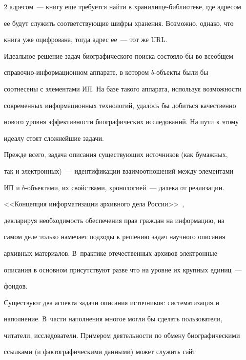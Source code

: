 \begin{multicols}{2}
адресом~--- книгу еще требуется \mbox{найти} в хранилище-библиотеке, где адресом 


ее будут служить соответствующие шиф\-ры хранения. Возможно, однако, что 


книга уже оциф\-ро\-ва\-на, тогда адрес ее~--- тот же URL.


  


  Идеальное решение задач биографического поиска состояло бы во всеобщем 


справочно-ин\-фор\-ма\-ци\-он\-ном аппарате, в котором $b$-объекты были бы 


соотнесены с элементами ИП. На базе такого аппарата, используя возможности 


современных информационных технологий, удалось бы добиться качественно 


нового уровня эффективности биографических исследований. На пути к этому 


идеалу стоят сложнейшие задачи.


  


  Прежде всего, задача описания существующих источников (как бумажных, 


так и электронных)~--- идентификации взаимоотношений между элементами 


ИП и $b$-объектами, их свойствами, хронологией~--- далека от реализации. 


<<Концепция информатизации архивного дела России>>~\cite{12mar}, 


декларируя необходимость обеспечения прав граждан на информацию, на 


самом деле только намечает подходы к решению задач научного описания 


архивных материалов. В~практике отечественных архивов электронные 


описания в основном присутствуют разве что на уровне их крупных единиц~--- 


фондов. 


  


  Существуют два аспекта задачи описания источников: систематизация и 


наполнение. В~части наполнения многое могли бы сделать пользователи, 


читатели, исследователи. Примером деятельности по обмену биографическими 


ссылками (и фактографическими данными) может служить сайт 



\end{multicols}
